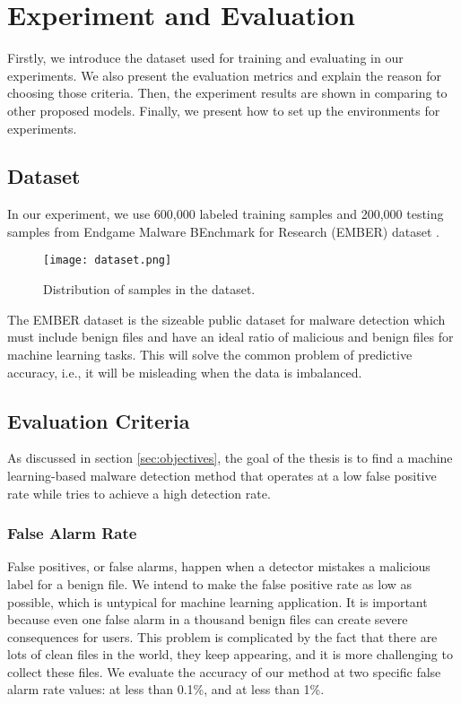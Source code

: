 \chapter{Experiment and Evaluation}
\graphicspath{{Chapter5/Figs/}}

\begin{chapabstract}
Firstly, we introduce the dataset used for training and evaluating in our experiments. We also present the evaluation metrics and explain the reason for choosing those criteria. Then, the experiment results are shown in comparing to other proposed models. Finally, we present how to set up the environments for experiments.
\end{chapabstract}

\section{Dataset}
\label{sec:dataset}

In our experiment, we use 600,000 labeled training samples and 200,000 testing samples from Endgame Malware BEnchmark for Research (EMBER) dataset \cite{anderson2018ember}.

\begin{figure}[H] 
\centering
\texttt{[image: dataset.png]}
\caption{Distribution of samples in the dataset.}
\label{fig:ember}
\end{figure}
 
The EMBER dataset is the sizeable public dataset for malware detection which must include benign files and have an ideal ratio of malicious and benign files for machine learning tasks. This will solve the common problem of predictive accuracy, i.e., it will be misleading when the data is imbalanced. 

\section{Evaluation Criteria}

As discussed in section \ref{sec:objectives}, the goal of the thesis is to find a machine learning-based malware detection method that operates at a low false positive rate while tries to achieve a high detection rate.

\subsection{False Alarm Rate}

False positives, or false alarms, happen when a detector mistakes a malicious label for a benign file. We intend to make the false positive rate as low as possible, which is untypical for machine learning application. It is important because even one false alarm in a thousand benign files can create severe consequences for users. This problem is complicated by the fact that there are lots of clean files in the world, they keep appearing, and it is more challenging to collect these files. We evaluate the accuracy of our method at two specific false alarm rate values: at less than 0.1\%, and at less than 1\%.

